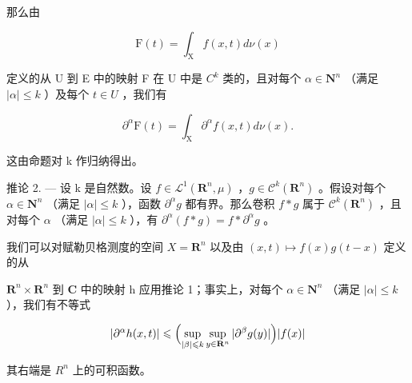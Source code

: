 那么由

\[
\mathrm{F} (t) = \int_ {\mathrm{X}} f (x, t) d \nu (x)
\]

定义的从 U 到 E 中的映射 F 在 U 中是 \(C^{k}\) 类的，且对每个 \(\alpha\in \mathbf{N}^{n}\) （满足 \(|\alpha|\leqslant k\) ）及每个 \(t\in U\) ，我们有

\[
\partial^ {\alpha} \mathrm{F} (t) = \int_ {\mathrm{X}} \partial^ {\alpha} f (x, t) d \nu (x).
\]

这由命题对 k 作归纳得出。

推论 2. --- 设 k 是自然数。设 \(f \in \mathcal{L}^1(\mathbf{R}^n, \mu)\) ，\(g \in \mathcal{C}^k(\mathbf{R}^n)\) 。假设对每个 \(\alpha \in \mathbf{N}^n\) （满足 \(|\alpha| \leqslant k\) ），函数 \(\partial^\alpha g\) 都有界。那么卷积 \(f * g\) 属于 \(\mathcal{C}^k(\mathbf{R}^n)\) ，且对每个 \(\alpha\) （满足 \(|\alpha| \leqslant k\) ），有 \(\partial^\alpha(f * g) = f * \partial^\alpha g\) 。

我们可以对赋勒贝格测度的空间 \(X = \mathbf{R}^{n}\) 以及由 \((x, t) \mapsto f(x)g(t - x)\) 定义的从

\(\mathbf{R}^{n} \times \mathbf{R}^{n}\) 到 \(\mathbf{C}\) 中的映射 h 应用推论 1；事实上，对每个 \(\alpha \in \mathbf{N}^{n}\) （满足 \(|\alpha| \leqslant k\) ），我们有不等式

\[
| \partial^ {\alpha} h (x, t) | \leqslant \Bigl (\sup _ {| \beta | \leqslant k} \sup _ {y \in \mathbf {R} ^ {n}} | \partial^ {\beta} g (y) | \Bigr) | f (x) |
\]

其右端是 \(R^{n}\) 上的可积函数。

